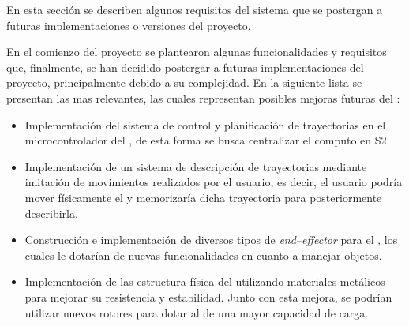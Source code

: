 En esta sección se describen algunos requisitos del sistema que se postergan a futuras implementaciones o versiones del proyecto.

En el comienzo del proyecto se plantearon algunas funcionalidades y requisitos que, finalmente, se han decidido postergar a futuras implementaciones del proyecto, principalmente debido a su complejidad. En la siguiente lista se presentan las mas relevantes, las cuales representan posibles mejoras futuras del \pArm{}:
\begin{itemize}
    \item Implementación del sistema de control y planificación de trayectorias en el microcontrolador del \pArm{}, de esta forma se busca centralizar el computo en \ac{S2}.
    \item Implementación de un sistema de descripción de trayectorias mediante imitación de movimientos realizados por el usuario, es decir, el usuario podría mover físicamente el \pArm{} y memorizaría dicha trayectoria para posteriormente describirla.
    \item Construcción e implementación de diversos tipos de \textit{end--effector} para el \pArm{}, los cuales le dotarían de nuevas funcionalidades en cuanto a manejar objetos.
    \item Implementación de las estructura física del \pArm{} utilizando materiales metálicos para mejorar su resistencia y estabilidad. Junto con esta mejora, se podrían utilizar nuevos rotores para dotar al \pArm{} de una mayor capacidad de carga.
\end{itemize}

  